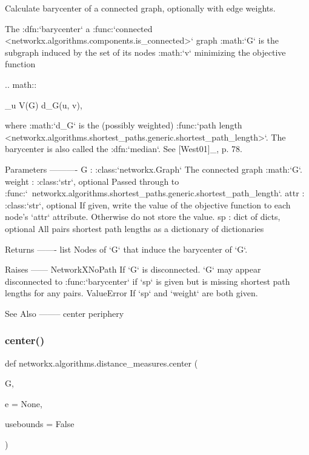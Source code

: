 \begin{DoxyVerb}Calculate barycenter of a connected graph, optionally with edge weights.

The :dfn:`barycenter` a
:func:`connected <networkx.algorithms.components.is_connected>` graph
:math:`G` is the subgraph induced by the set of its nodes :math:`v`
minimizing the objective function

.. math::

    \sum_{u \in V(G)} d_G(u, v),

where :math:`d_G` is the (possibly weighted) :func:`path length
<networkx.algorithms.shortest_paths.generic.shortest_path_length>`.
The barycenter is also called the :dfn:`median`. See [West01]_, p. 78.

Parameters
----------
G : :class:`networkx.Graph`
    The connected graph :math:`G`.
weight : :class:`str`, optional
    Passed through to
    :func:`~networkx.algorithms.shortest_paths.generic.shortest_path_length`.
attr : :class:`str`, optional
    If given, write the value of the objective function to each node's
    `attr` attribute. Otherwise do not store the value.
sp : dict of dicts, optional
   All pairs shortest path lengths as a dictionary of dictionaries

Returns
-------
list
    Nodes of `G` that induce the barycenter of `G`.

Raises
------
NetworkXNoPath
    If `G` is disconnected. `G` may appear disconnected to
    :func:`barycenter` if `sp` is given but is missing shortest path
    lengths for any pairs.
ValueError
    If `sp` and `weight` are both given.

See Also
--------
center
periphery
\end{DoxyVerb}
 \mbox{\label{namespacenetworkx_1_1algorithms_1_1distance__measures_a03f5865f14e2dc2b14e15dfc0f9a8d66}} 
\subsubsection{\texorpdfstring{center()}{center()}}
{\footnotesize\ttfamily def networkx.\+algorithms.\+distance\+\_\+measures.\+center (\begin{DoxyParamCaption}\item[{}]{G,  }\item[{}]{e = {\ttfamily None},  }\item[{}]{usebounds = {\ttfamily False} }\end{DoxyParamCaption})}

